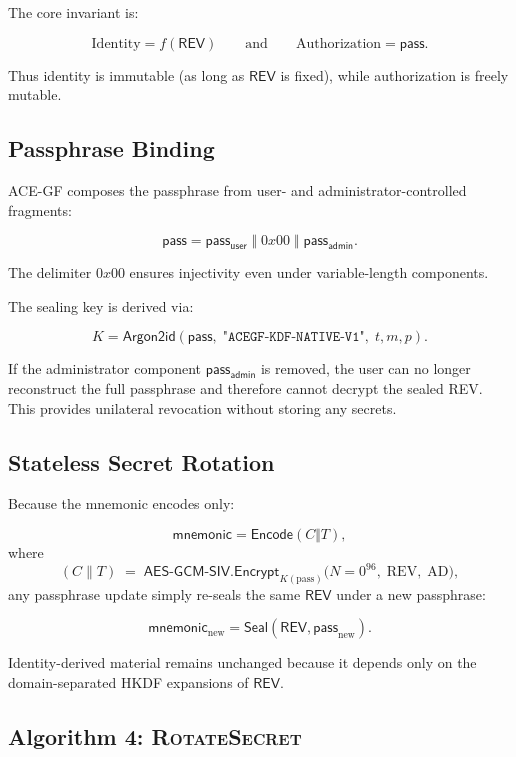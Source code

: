 \documentclass[12pt,a4paper]{article}
\begin{document}
  The core invariant is:

  \[
   \text{Identity} = f(\mathsf{REV}) \qquad\text{and}\qquad
   \text{Authorization} = \mathsf{pass}.
  \]

  Thus identity is immutable (as long as $\mathsf{REV}$ is fixed), while
  authorization is freely mutable.

  \subsection{Passphrase Binding}

  ACE-GF composes the passphrase from user- and administrator-controlled fragments:

  \[
   \mathsf{pass}
   =
   \mathsf{pass_{user}}
   \;\Vert\; 0x00 \;\Vert\;
   \mathsf{pass_{admin}}.
  \]

  The delimiter $0x00$ ensures injectivity even under variable-length components.

  The sealing key is derived via:

  \[
   K = \mathsf{Argon2id}(
   \mathsf{pass},\;
   \texttt{"ACEGF-KDF-NATIVE-V1"},\;
   t, m, p).
  \]

  If the administrator component $\mathsf{pass_{admin}}$ is removed, the user can no
  longer reconstruct the full passphrase and therefore cannot decrypt the sealed
  REV. This provides unilateral revocation without storing any secrets.

  \subsection{Stateless Secret Rotation}

  Because the mnemonic encodes only:

  \[
   \mathsf{mnemonic} = \mathsf{Encode}(C \Vert T),
  \]
  where
  \[
   (C \parallel T) \;=\; \mathsf{AES\text{-}GCM\text{-}SIV.Encrypt}_{K(\text{pass})}
   \bigl(N = 0^{96},\; \mathrm{REV},\; \mathrm{AD}\bigr),
  \]
  any passphrase update simply re-seals the same $\mathsf{REV}$ under a new
  passphrase:

  \[
   \mathsf{mnemonic}_{\text{new}}
   =
   \mathsf{Seal}(\mathsf{REV}, \mathsf{pass}_{\text{new}}).
  \]

  Identity-derived material remains unchanged because it depends only on the
  domain-separated HKDF expansions of $\mathsf{REV}$.

  \subsection{Algorithm 4: \textsc{RotateSecret}}
\end{document}

